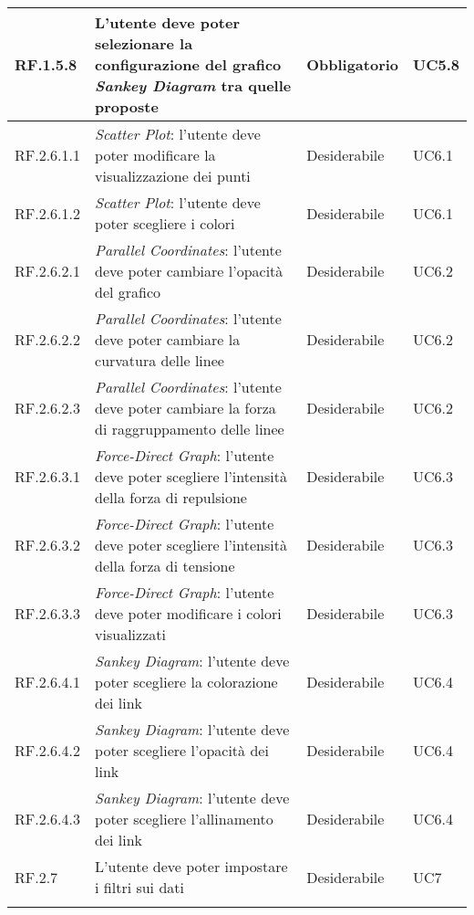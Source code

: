 \begin{center}
\begin{longtable}{|L{1,5cm}|C{5,5cm}|C{3cm}|C{2cm}|}
    RF.1.5.8 & L'utente deve poter selezionare la configurazione del grafico \textit{Sankey Diagram} tra quelle proposte& Obbligatorio & UC5.8 \\ \hline
    RF.2.6.1.1 & \textit{Scatter Plot}: l'utente deve poter modificare la visualizzazione dei punti & Desiderabile & UC6.1 \\ \hline
    RF.2.6.1.2 & \textit{Scatter Plot}: l'utente deve poter scegliere i colori  & Desiderabile & UC6.1 \\ \hline
    RF.2.6.2.1 & \textit{Parallel Coordinates}: l'utente deve poter cambiare l'opacità del grafico & Desiderabile & UC6.2 \\ \hline
    RF.2.6.2.2 & \textit{Parallel Coordinates}: l'utente deve poter cambiare la curvatura delle linee & Desiderabile & UC6.2 \\ \hline
    RF.2.6.2.3 & \textit{Parallel Coordinates}: l'utente deve poter cambiare la forza di raggruppamento delle linee & Desiderabile & UC6.2 \\ \hline
    RF.2.6.3.1 & \textit{Force-Direct Graph}: l'utente deve poter scegliere l'intensità della forza di repulsione & Desiderabile & UC6.3 \\ \hline
    RF.2.6.3.2 & \textit{Force-Direct Graph}: l'utente deve poter scegliere l'intensità della forza di tensione & Desiderabile & UC6.3 \\ \hline
    RF.2.6.3.3 & \textit{Force-Direct Graph}: l'utente deve poter modificare i colori visualizzati & Desiderabile & UC6.3 \\ \hline
    RF.2.6.4.1 & \textit{Sankey Diagram}: l'utente deve poter scegliere la colorazione dei link & Desiderabile & UC6.4 \\ \hline
    RF.2.6.4.2 & \textit{Sankey Diagram}: l'utente deve poter scegliere l'opacità dei link & Desiderabile & UC6.4 \\ \hline
    RF.2.6.4.3 & \textit{Sankey Diagram}: l'utente deve poter scegliere l'allinamento dei link & Desiderabile & UC6.4 \\ \hline
    RF.2.7 & L'utente deve poter impostare i filtri sui dati & Desiderabile & UC7 \\ \hline

\end{longtable}
\end{center}
